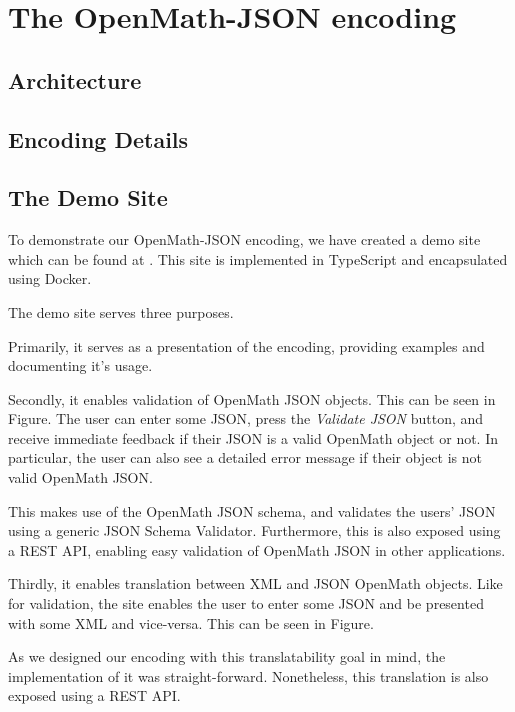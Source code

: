 \section{The OpenMath-JSON encoding}

\subsection{Architecture}

\subsection{Encoding Details}

\subsection{The Demo Site}

To demonstrate our OpenMath-JSON encoding, we have created a demo site which can be found at . 
This site is implemented in TypeScript and encapsulated using Docker. 

The demo site serves three purposes.

Primarily, it serves as a presentation of the encoding, providing examples and documenting it's usage. 

Secondly, it enables validation of OpenMath JSON objects. This can be seen in Figure.
The user can enter some JSON, press the \textit{Validate JSON} button, and receive immediate feedback if their JSON is a valid OpenMath object or not. 
In particular, the user can also see a detailed error message if their object is not valid OpenMath JSON. 

This makes use of the OpenMath JSON schema, and validates the users' JSON using a generic JSON Schema Validator. 
Furthermore, this is also exposed using a REST API, enabling easy validation of OpenMath JSON in other applications. 

Thirdly, it enables translation between XML and JSON OpenMath objects. 
Like for validation, the site enables the user to enter some JSON and be presented with some XML and vice-versa. 
This can be seen in Figure.

As we designed our encoding with this translatability goal in mind, the implementation of it was straight-forward. 
Nonetheless, this translation is also exposed using a REST API. 
